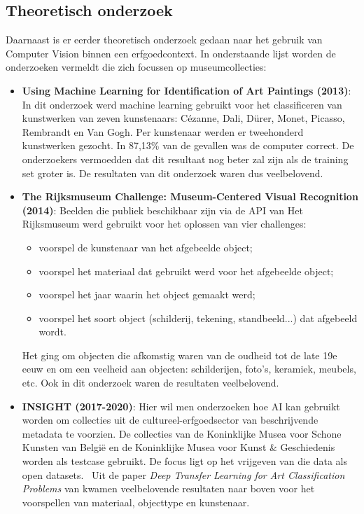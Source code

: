 \documentclass[fleqn,10pt]{voorstel}
\begin{document}
\subsection{Theoretisch onderzoek}
Daarnaast is er eerder theoretisch onderzoek gedaan naar het gebruik van Computer Vision binnen een erfgoedcontext. In onderstaande lijst worden de onderzoeken vermeldt die zich focussen op museumcollecties:
\begin{itemize}
	\item \textbf{Using Machine Learning for Identification of Art Paintings (2013)}: In dit onderzoek werd machine learning gebruikt voor het classificeren van kunstwerken van zeven kunstenaars: C\'{e}zanne, Dali, D\"{u}rer, Monet, Picasso, Rembrandt en Van Gogh. Per kunstenaar werden er tweehonderd kunstwerken gezocht. In 87,13\% van de gevallen was de computer correct. De onderzoekers vermoedden dat dit resultaat nog beter zal zijn als de training set groter is. De resultaten van dit onderzoek waren dus veelbelovend.~\autocite{Blessings2013}
	
	\item \textbf{The Rijksmuseum Challenge: Museum-Centered Visual Recognition (2014)}: Beelden die publiek beschikbaar zijn via de API van Het Rijksmuseum werd gebruikt voor het oplossen van vier challenges: 
	\begin{itemize}
		\item voorspel de kunstenaar van het afgebeelde object;
		\item voorspel het materiaal dat gebruikt werd voor het afgebeelde object;
		\item voorspel het jaar waarin het object gemaakt werd;
		\item voorspel het soort object (schilderij, tekening, standbeeld...) dat afgebeeld wordt.
	\end{itemize}
	Het ging om objecten die afkomstig waren van de oudheid tot de late 19e eeuw en om een veelheid aan objecten: schilderijen, foto's, keramiek, meubels, etc. Ook in dit onderzoek waren de resultaten veelbelovend.~\autocite{Mensink2014}
	
	\item \textbf{INSIGHT (2017-2020)}: Hier wil men onderzoeken hoe AI kan gebruikt worden om collecties uit de cultureel-erfgoedsector van beschrijvende metadata te voorzien. De collecties van de Koninklijke Musea voor Schone Kunsten van België en de Koninklijke Musea voor Kunst \& Geschiedenis worden als testcase gebruikt. De focus ligt op het vrijgeven van die data als open datasets.~\autocite{UniAntwerpen2017?} Uit de paper \emph{Deep Transfer Learning for Art Classification Problems} van \textcite{Sabatelli2018} kwamen veelbelovende resultaten naar boven voor het voorspellen van materiaal, objecttype en kunstenaar.
	

\end{itemize}
\end{document}
